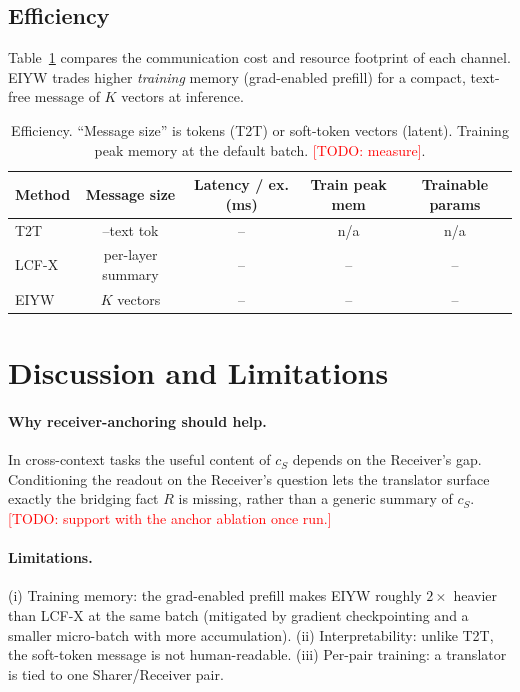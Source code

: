 \documentclass[11pt]{article}
\newcommand{\method}{\textsc{EIYW}\xspace}      %
\newcommand{\lcfx}{\textsc{LCF-X}\xspace}        %
\newcommand{\ttt}{\textsc{T2T}\xspace}           %
\newcommand{\sharer}{\textsf{Sharer}\xspace}
\newcommand{\receiver}{\textsf{Receiver}\xspace}
\newcommand{\TODO}[1]{\textcolor{red}{[TODO: #1]}}
\newcommand{\res}{--}                             %
\begin{document}
\subsection{Efficiency}
Table~\ref{tab:efficiency} compares the communication cost and resource
footprint of each channel. \method trades higher \emph{training} memory
(grad-enabled prefill) for a compact, text-free message of $K$ vectors at
inference.

\begin{table}[h]
  \centering
  \caption{Efficiency. ``Message size'' is tokens (\ttt) or soft-token vectors
  (latent). Training peak memory at the default batch. \TODO{measure}.}
  \label{tab:efficiency}
  \begin{tabular}{l c c c c}
    \toprule
    Method & Message size & Latency / ex. (ms) & Train peak mem & Trainable params \\
    \midrule
    \ttt   & \res text tok & \res & n/a & n/a \\
    \lcfx  & per-layer summary & \res & \res & \res \\
    \method & $K$ vectors & \res & \res & \res \\
    \bottomrule
  \end{tabular}
\end{table}

\section{Discussion and Limitations}
\paragraph{Why receiver-anchoring should help.} In cross-context tasks the
useful content of $c_S$ depends on the \receiver's gap. Conditioning the readout
on the \receiver's question lets the translator surface exactly the bridging
fact $R$ is missing, rather than a generic summary of $c_S$. \TODO{support with
the anchor ablation once run.}

\paragraph{Limitations.}
(i) Training memory: the grad-enabled prefill makes \method roughly $2\times$
heavier than \lcfx at the same batch (mitigated by gradient checkpointing and a
smaller micro-batch with more accumulation).
(ii) Interpretability: unlike \ttt, the soft-token message is not human-readable.
(iii) Per-pair training: a translator is tied to one \sharer/\receiver pair.
\end{document}
